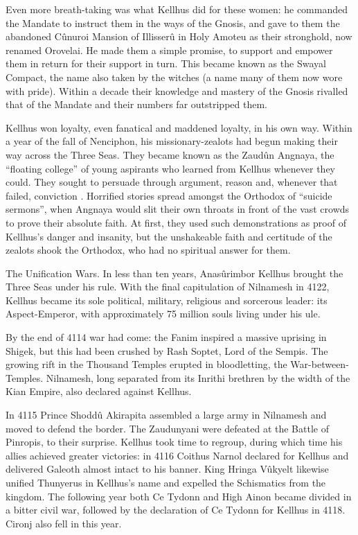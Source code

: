 \documentclass[]{book}
\begin{document}
Even more breath-taking was what Kellhus did for these women: he commanded the
Mandate to instruct them in the ways of the Gnosis, and gave to them the abandoned
Cûnuroi Mansion of Illisserû in Holy Amoteu as their stronghold, now renamed
Orovelai. He made them a simple promise, to support and empower them in return for
their support in turn. This became known as the Swayal Compact, the name also taken
by the witches (a name many of them now wore with pride). Within a decade their
knowledge and mastery of the Gnosis rivalled that of the Mandate and their numbers
far outstripped them.

Kellhus won loyalty, even fanatical and maddened loyalty, in his own way. Within a
year of the fall of Nenciphon, his missionary-zealots had begun making their way across
the Three Seas. They became known as the Zaudûn Angnaya, the ``floating college'' of
young aspirants who learned from Kellhus whenever they could. They sought to
persuade through argument, reason and, whenever that failed, conviction . Horrified
stories spread amongst the Orthodox of ``suicide sermons'', when Angnaya would slit
their own throats in front of the vast crowds to prove their absolute faith. At first, they
used such demonstrations as proof of Kellhus's danger and insanity, but the
unshakeable faith and certitude of the zealots shook the Orthodox, who had no
spiritual answer for them.

The Unification Wars. In less than ten years, Anasûrimbor Kellhus brought the Three Seas under his
rule. With the final capitulation of Nilnamesh in 4122, Kellhus became its sole political, military,
religious and sorcerous leader: its Aspect-Emperor, with approximately 75 million souls living under his ule.

By the end of 4114 war had come: the Fanim inspired a massive uprising in Shigek, but
this had been crushed by Rash Soptet, Lord of the Sempis. The growing rift in the
Thousand Temples erupted in bloodletting, the War-between-Temples. Nilnamesh,
long separated from its Inrithi brethren by the width of the Kian Empire, also declared
against Kellhus.

In 4115 Prince Shoddû Akirapita assembled a large army in Nilnamesh and moved to
defend the border. The Zaudunyani were defeated at the Battle of Pinropis, to their
surprise. Kellhus took time to regroup, during which time his allies achieved greater
victories: in 4116 Coithus Narnol declared for Kellhus and delivered Galeoth almost
intact to his banner. King Hringa Vûkyelt likewise unified Thunyerus in Kellhus's
name and expelled the Schismatics from the kingdom. The following year both Ce
Tydonn and High Ainon became divided in a bitter civil war, followed by the
declaration of Ce Tydonn for Kellhus in 4118. Cironj also fell in this year.
\end{document}
